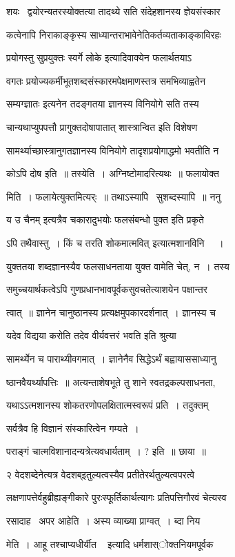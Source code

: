 \documentclass[11pt, openany]{book}
\begin{document}
शयः \textendash\ द्वयोरन्यतरस्योक्तत्या तादथ्ये सति संदेहशानस्य ज्ञेयसंस्कार \textendash\ 

कत्वेनापि निराकाङ्कृस्य साध्यान्तराभावेनेतिकर्तव्यताकाङ्काविरहः

प्रयोगस्तु {\qt सुप्रयुक्तः स्वर्गे लोके} इत्यादिवाक्येन फलार्थतयाऽ \textendash\ 

वगतः प्रयोज्यकर्मीभूतशब्दसंस्कारमपेक्षमाणस्तत्र समभिव्याह्वतेन 

{\qt सम्यग्ज्ञातः} इत्यनेन तदङ्गतया ज्ञानस्य विनियोगे सति तस्य 

चान्यथाप्युपपत्तौ प्रागुक्तदोषापातात् शास्त्रान्वित इति विशेषण \textendash\ 

सामर्थ्याच्छास्त्रानुगतज्ञानस्य विनियोगे तादृशप्रयोगाद्धमो भवतीति न 

कोऽपि दोष इति~॥ तस्येति~। अग्निष्टोमादरित्यथः~॥ फलायोक्त \textendash\ 

मिति~। फलायेत्युक्तमित्यर्ः~॥ तथाऽस्यापि \textendash\ सुशब्दस्यापि~॥ ननु 

{\qt य उ चैनम्} इत्यत्रैव चकारादुभयोः फलसंबन्धो पुक्त इति प्रकृते \textendash\ 

ऽपि तथैवास्तु~। किं च {\qt तरति शोकमात्मवित्}  इत्यात्मशानविनि \textendash\ ~। 

युक्ततया शब्दज्ञानस्यैव फलसाधनताया युक्त वामेति चेत्, न~। तस्य 

समुच्चयार्थकत्वेऽपि गुणप्रधानभावपूर्वकसुवचतेत्याशयेन पक्षान्तर \textendash\ 

त्वात्~॥ ज्ञानेन चानुष्ठानस्य प्रत्यक्षमुपकारदर्शनात्~। ज्ञानस्य च 

{\qt यदेव विद्यया करोति तदेव वीर्यवत्तरं भवति} इति श्रुत्या 

सामर्थ्येन च पाराथ्यीवगमात्~। ज्ञानेनैव सिद्धेऽर्थं बह्वायाससाध्यानु \textendash\ 

ष्ठानवैयर्थ्यापत्तिः~॥ अत्यन्ताशेषभूते तु शाने स्वतद्रकल्पसाधनता, 

यथाऽऽत्मशानस्य शोकतरणोपलक्षितात्मस्वरूपं प्रति~। तदुक्तम् \textendash\ 

सर्वत्रैव हि विज्ञानं संस्कारित्वेन गम्यते~। 

पराङ्गं चात्मविशानादन्यत्रेत्यवधार्यताम्~। ? इति~॥ छाया~॥ 

२ वेदशब्देनेत्यत्र वेदशब्इतुल्यत्वस्यैव प्रतीतेरर्थतुल्यत्वपरत्वे 

लक्षणापत्तेर्वहुब्रीह्यङ्गीकारे पुरःस्फूर्तिकार्थत्यागः प्रतिपत्तिगौरवं
चेत्यस्व \textendash\ 

रसादाह \textendash\ अपर आहेति~। अस्य व्याख्या प्राग्वत्~। ब्दा निय \textendash\ 

मेति~। {\qt आहू तश्चाप्यधीर्यीत \textendash\ } इत्यादि धर्मशास्ोक्तनियमपूर्वक \textendash\ 
\end{document}
